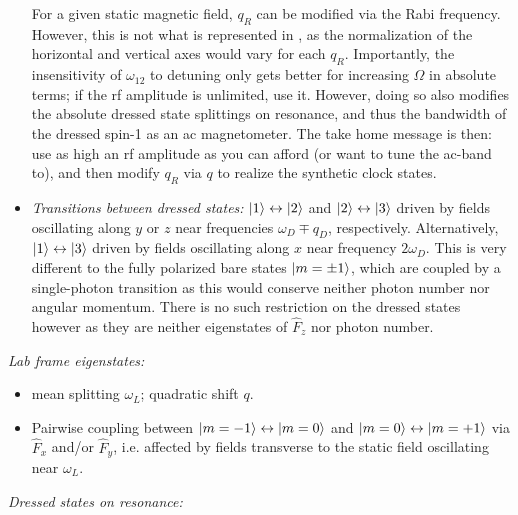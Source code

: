 \documentclass[aps,prl,reprint,superscriptaddress,floatfix]{revtex4-1}
\begin{document}
\begin{itemize}
    For a given static magnetic field, $q_R$ can be modified via the Rabi frequency.
    However, this is not what is represented in , as the normalization of the horizontal and vertical axes would vary for each $q_R$.
    Importantly, the insensitivity of $\omega_{12}$ to detuning only gets better for increasing $\Omega$ in absolute terms; if the rf amplitude is unlimited, use it.
    However, doing so also modifies the absolute dressed state splittings on resonance, and thus the bandwidth of the dressed spin-1 as an ac magnetometer.
    The take home message is then: use as high an rf amplitude as you can afford (or want to tune the ac-band to), and then modify $q_R$ via $q$ to realize the synthetic clock states.
    \item \textit{Transitions between dressed states:} $\vert 1 \rangle  \leftrightarrow \vert 2 \rangle $ and $\vert 2 \rangle  \leftrightarrow \vert 3 \rangle $ driven by fields oscillating along $y$ or $z$ near frequencies $\omega_D \mp q_D$, respectively.
    Alternatively, $\vert 1 \rangle  \leftrightarrow \vert 3 \rangle $ driven by fields oscillating along $x$ near frequency $2\omega_D$.
    This is very different to the fully polarized bare states $\vert m=\pm 1 \rangle $, which are coupled by a single-photon transition as this would conserve neither photon number nor angular momentum.
    There is no such restriction on the dressed states however as they are neither eigenstates of $\hat{F}_z$ nor photon number. 
\end{itemize}
\textit{Lab frame eigenstates:}
\begin{itemize}
    \item mean splitting $\omega_L$; quadratic shift $q$.
    \item Pairwise coupling between $\vert m=-1 \rangle  \leftrightarrow \vert m=0 \rangle $ and $\vert m=0 \rangle  \leftrightarrow \vert m=+1 \rangle $ via $\hat{F}_x$ and/or $\hat{F}_y$, i.e. affected by fields transverse to the static field oscillating near $\omega_L$.
\end{itemize}
\textit{Dressed states on resonance:}
\end{document}
